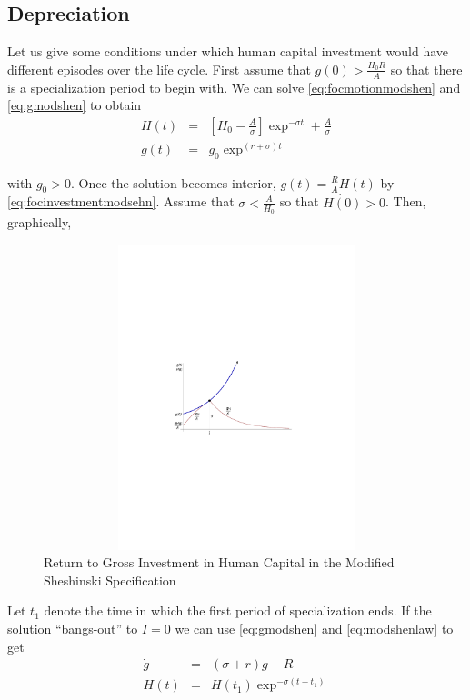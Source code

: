 \subsection{Depreciation} \label{section:cycles}
Let us give some conditions under which human capital investment would have different episodes over the life cycle. First assume that $g(0) > \frac{H_{0} R}{A}$ so that there is a specialization period to begin with. We can solve \eqref{eq:focmotionmodshen} and \eqref{eq:gmodshen} to obtain
\begin{eqnarray}
H(t) &=& \left[ H_{0} - \frac{A}{\sigma} \right] \exp^{- \sigma t} + \frac{A}{\sigma} \nonumber \\
g(t) &=& g_{0} \exp^{(r + \sigma)t} \label{eq:gmodshent1} \nonumber
\end{eqnarray}

\noindent with $g_{0} > 0$. Once the solution becomes interior, $g(t) = \frac{R}{A} H(t)$ by \eqref{eq:focinvestmentmodsehn}. Assume that  $\sigma < \frac{A}{H_{0}}$ so that $\dot{H(0)} > 0$. Then, graphically,

\begin{center}
\begin{figure}[H]
\caption{Return to Gross Investment in Human Capital in the Modified Sheshinski Specification}
\centering
\includegraphics[width=4.5in, height=3.5in]{Figures/fig-shesh-for-intersection.pdf}
\end{figure}
\end{center}

\indent Let $t_{1}$ denote the time in which the first period of specialization ends. If the solution ``bangs-out'' to $I=0$ we can use \eqref{eq:gmodshen} and \eqref{eq:modshenlaw} to get
\begin{eqnarray}
\dot{g} &=& (\sigma + r)g - R \nonumber \\
H(t) &=& H(t_{1}) \exp^{-\sigma(t - t_{1})} 
\end{eqnarray}

